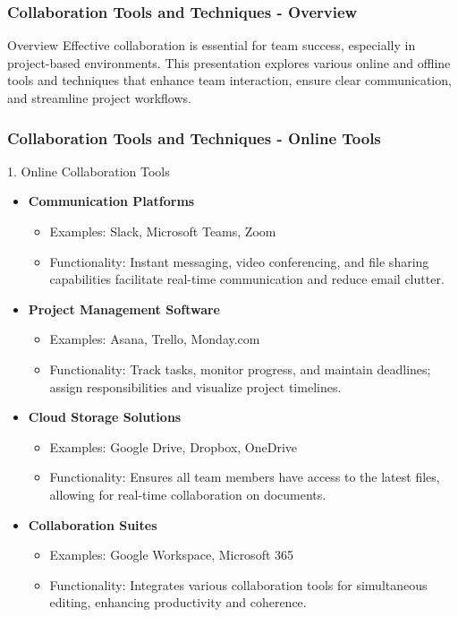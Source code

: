 \documentclass[aspectratio=169]{beamer}
\begin{document}
\begin{frame}[fragile]
    \frametitle{Collaboration Tools and Techniques - Overview}
    \begin{block}{Overview}
        Effective collaboration is essential for team success, especially in project-based environments. 
        This presentation explores various online and offline tools and techniques that enhance team interaction, 
        ensure clear communication, and streamline project workflows.
    \end{block}
\end{frame}

\begin{frame}[fragile]
    \frametitle{Collaboration Tools and Techniques - Online Tools}
    \begin{block}{1. Online Collaboration Tools}
        \begin{itemize}
            \item \textbf{Communication Platforms}
                \begin{itemize}
                    \item Examples: Slack, Microsoft Teams, Zoom
                    \item Functionality: Instant messaging, video conferencing, and file sharing capabilities facilitate real-time communication and reduce email clutter.
                \end{itemize}
            \item \textbf{Project Management Software}
                \begin{itemize}
                    \item Examples: Asana, Trello, Monday.com
                    \item Functionality: Track tasks, monitor progress, and maintain deadlines; assign responsibilities and visualize project timelines.
                \end{itemize}
            \item \textbf{Cloud Storage Solutions}
                \begin{itemize}
                    \item Examples: Google Drive, Dropbox, OneDrive
                    \item Functionality: Ensures all team members have access to the latest files, allowing for real-time collaboration on documents.
                \end{itemize}
            \item \textbf{Collaboration Suites}
                \begin{itemize}
                    \item Examples: Google Workspace, Microsoft 365
                    \item Functionality: Integrates various collaboration tools for simultaneous editing, enhancing productivity and coherence.
                \end{itemize}
        \end{itemize}
    \end{block}
\end{frame}
\end{document}
